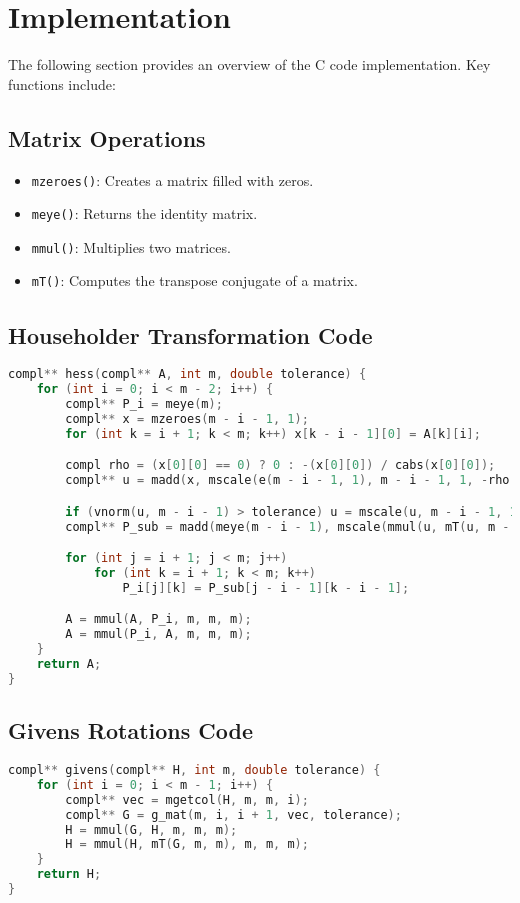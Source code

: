 \documentclass[12pt]{article}
\begin{document}
\section{Implementation}
The following section provides an overview of the C code implementation. Key functions include:

\subsection{Matrix Operations}
\begin{itemize}
    \item \texttt{mzeroes()}: Creates a matrix filled with zeros.
    \item \texttt{meye()}: Returns the identity matrix.
    \item \texttt{mmul()}: Multiplies two matrices.
    \item \texttt{mT()}: Computes the transpose conjugate of a matrix.
\end{itemize}

\subsection{Householder Transformation Code}
\begin{lstlisting}[language=C, caption=Hessenberg Reduction]
compl** hess(compl** A, int m, double tolerance) {
    for (int i = 0; i < m - 2; i++) {
        compl** P_i = meye(m);
        compl** x = mzeroes(m - i - 1, 1);
        for (int k = i + 1; k < m; k++) x[k - i - 1][0] = A[k][i];

        compl rho = (x[0][0] == 0) ? 0 : -(x[0][0]) / cabs(x[0][0]);
        compl** u = madd(x, mscale(e(m - i - 1, 1), m - i - 1, 1, -rho * vnorm(x, m - i - 1)), m - i - 1, 1);

        if (vnorm(u, m - i - 1) > tolerance) u = mscale(u, m - i - 1, 1, 1 / vnorm(u, m - i - 1));
        compl** P_sub = madd(meye(m - i - 1), mscale(mmul(u, mT(u, m - i - 1, 1), m - i - 1, 1, m - i - 1), -2), m - i - 1, m - i - 1);

        for (int j = i + 1; j < m; j++)
            for (int k = i + 1; k < m; k++)
                P_i[j][k] = P_sub[j - i - 1][k - i - 1];

        A = mmul(A, P_i, m, m, m);
        A = mmul(P_i, A, m, m, m);
    }
    return A;
}
\end{lstlisting}

\subsection{Givens Rotations Code}
\begin{lstlisting}[language=C, caption=Givens Rotations]
compl** givens(compl** H, int m, double tolerance) {
    for (int i = 0; i < m - 1; i++) {
        compl** vec = mgetcol(H, m, m, i);
        compl** G = g_mat(m, i, i + 1, vec, tolerance);
        H = mmul(G, H, m, m, m);
        H = mmul(H, mT(G, m, m), m, m, m);
    }
    return H;
}
\end{lstlisting}
\end{document}
